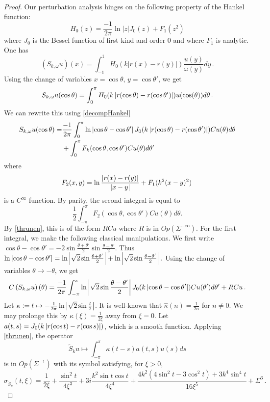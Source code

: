 \documentclass[a4paper]{article}
\begin{document}
\begin{proof}
	Our perturbation analysis hinges on the following property of the Hankel function:
	\begin{equation}
	\label{decompHankel}
	H_0(z) = \frac{-1}{2\pi}\ln|z| J_0(z) + F_1(z^2)
	\end{equation}
	where $J_0$ is the Bessel function of first kind and order $0$ and where $F_1$ is analytic. One has
	\[\left(S_{k,\omega} u\right)(x) = \int_{-1}^1 H_0(k|r(x) - r(y)|)\frac{u(y)}{\omega(y)}dy\,.\]
	Using the change of variables $x = \cos\theta$, $y = \cos \theta'$, we get 
	\[ S_{k,\omega} u(\cos \theta) = \int_{0}^\pi H_0(k \left\lvert r(\cos \theta) - r(\cos \theta') \right\rvert) u(\cos(\theta)) d\theta\,.\]
	We can rewrite this using \eqref{decompHankel}
	\[\begin{split}
	S_{k,\omega} u(\cos \theta) = &\frac{-1}{2\pi}\int_{0}^\pi \ln \left\lvert \cos \theta - \cos \theta' \right\rvert J_0(k \left\lvert r(\cos \theta) - r(\cos \theta') \right\rvert)Cu(\theta) d\theta \\
	&+ \int_{0}^\pi F_k(\cos\theta,\cos\theta') Cu(\theta) d\theta'
	\end{split}\]
	where 
	\[F_2(x,y) = \ln \frac{\left\lvert r(x)-r(y) \right\rvert}{\left\lvert x-y \right\rvert} + F_1(k^2(x - y)^2)\,\]
	is a $C^\infty$ function. 
	By parity, the second integral is equal to 
	\[\frac{1}{2} \int_{-\pi}^{\pi} F_2(\cos\theta,\cos\theta') Cu(\theta) d\theta.\]
	By \autoref{thrunen}, this is of the form $RCu$ where $R$ is in $\textit{Op}(\Sigma^{-\infty})$. For the first integral, we make the following classical manipulations. We first write $\cos \theta - \cos\theta' = - 2 \sin \frac{\theta + \theta'}{2}\sin \frac{\theta - \theta'}{2}$. Thus $\ln\left\lvert \cos \theta - \cos\theta' \right\rvert= \ln \left\lvert \sqrt{2} \sin \frac{\theta + \theta'}{2} \right\rvert + \ln \left\lvert \sqrt{2}\sin \frac{\theta - \theta'}{2} \right\rvert.$ Using the change of variables $\theta \to - \theta$, we get 
	\[C\left(S_{k,\omega}u\right)(\theta) = \frac{-1}{2\pi} \int_{-\pi}^\pi \ln \left\lvert \sqrt{2} \sin \frac{\theta - \theta'}{2} \right\rvert J_0(k\left\lvert \cos\theta - \cos \theta' \right\rvert)Cu(\theta')d\theta' + RCu\,.\]
	Let $\kappa \mathrel{\mathop:}= t \mapsto -\frac{1}{2\pi}\ln \left\lvert \sqrt{2} \sin \frac{t}{2} \right\rvert$. It is well-known that $\hat{\kappa}(n) = \frac{1}{2n}$ for $n \neq 0$. We may prolonge this by $\kappa(\xi) = \frac{1}{2\xi}$ away from $\xi = 0$. Let $a(t,s) = J_0(k\left\lvert r(\cos t ) - r(\cos s) \right\rvert)$, which is a smooth function. Applying \autoref{thrunen}, the operator
	\[\tilde{S}_k u \mapsto \int_{-\pi}^\pi \kappa(t-s) a(t,s)u(s)ds\]
	is in $\textit{Op}(\Sigma^{-1})$ with its symbol satisfying, for $\xi > 0$,
	\[\sigma_{\tilde{S}_k}(t,\xi) = \frac{1}{2\xi} + \frac{\sin^2 t}{4\xi^3} + 3i\frac{k^2 \sin t \cos t}{4\xi^4}  + \frac{4k^2(4\sin^2t - 3 \cos^2t) + 3k^4\sin^4 t}{16 \xi^5} + \Sigma^6\,.\]

\end{proof}
\end{document}
